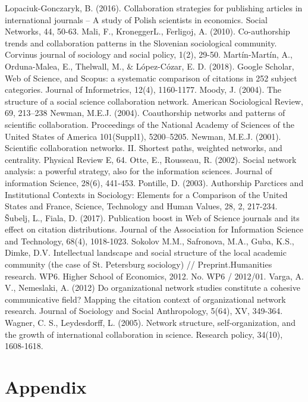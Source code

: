 \documentclass[11pt]{article} %
\begin{document}
\begin{thebibliography}{99}
   Lopaciuk-Gonczaryk, B. (2016). Collaboration strategies for publishing articles in international journals – A study of Polish scientists in economics. Social Networks, 44, 50-63.   
   Mali, F., KroneggerL., Ferligoj, A. (2010). Co-authorship trends and collaboration patterns in the Slovenian sociological community. Corvinus journal of sociology and social policy, 1(2), 29-50.
Martín-Martín, A., Orduna-Malea, E., Thelwall, M., \& López-Cózar, E. D. (2018). Google Scholar, Web of Science, and Scopus: a systematic comparison of citations in 252 subject categories. Journal of Informetrics, 12(4), 1160-1177.
   Moody, J. (2004). The structure of a social science collaboration network. American Sociological Review, 69, 213–238
   Newman, M.E.J. (2004). Coauthorship networks and patterns of scientific collaboration. Proceedings of the National Academy of Sciences of the United States of America 101(Suppl1), 5200–5205. 
   Newman, M.E.J. (2001). Scientific collaboration networks. II. Shortest paths, weighted networks, and centrality. Physical Review E, 64. 
   Otte, E., Rousseau, R. (2002). Social network analysis: a powerful strategy, also for the information sciences. Journal of information Science, 28(6), 441-453. 
   Pontille, D. (2003). Authorship Parctices and Institutional Contexts in Sociology: Elements for a Comparison of the United States and France, Science, Technology and Human Values, 28, 2, 217-234.
   Šubelj, L., Fiala, D. (2017). Publication boost in Web of Science journals and its effect on citation distributions. Journal of the Association for Information Science and Technology, 68(4), 1018-1023.
   Sokolov M.M., Safronova, M.A., Guba, K.S., Dimke, D.V. Intellectual landscape and social structure of the local academic community (the case of St. Petersburg sociology) // Preprint.Humanities research. WP6. Higher School of Economics, 2012. No. WP6 / 2012/01.
   Varga, A. V., Nemeslaki, A. (2012) Do organizational network studies constitute a cohesive communicative field? Mapping the citation context of organizational network research. Journal of Sociology and Social Anthropology, 5(64), XV, 349-364. 
   Wagner, C. S.,  Leydesdorff, L. (2005). Network structure, self-organization, and the growth of international collaboration in science. Research policy, 34(10), 1608-1618.   
\end{thebibliography}   
   

\appendix
\section{Appendix}
\end{document}
